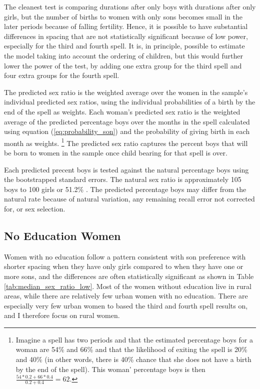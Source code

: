\documentclass[12pt,letterpaper]{article}
\begin{document}
The cleanest test is comparing durations after only boys with durations after
only girls, but the number of births to women with only sons becomes small 
in the later periods because of falling fertility.
Hence, it is possible to have substantial differences in spacing that are
not statistically significant because of low power, especially for the third 
and fourth spell.
It is, in principle, possible to estimate the model taking into account the 
ordering of children, but this would further lower the power of the test, by 
adding one extra group for the third spell and four extra groups for the fourth spell.

The predicted sex ratio is the weighted average over the women in the sample's 
individual predicted sex ratios, using the individual probabilities of a birth by 
the end of the spell as weights.
Each woman's predicted sex ratio is the weighted average of the predicted
percentage boys over the months in the spell calculated using equation 
(\ref{eq:probability_son}) and the probability of giving birth in each month 
as weights.%
\footnote{
Imagine a spell has two periods and that the estimated percentage boys for a
woman are 54\% and 66\% and that the likelihood of exiting the spell is 20\% and 40\%
(in other words, there is 40\% chance that she does not have a birth by the end of 
the spell).
This woman' percentage boys is then $\frac{54*0.2+66*0.4}{0.2+0.4} = 62$.
}
The predicted sex ratio captures the percent boys that will be born to women 
in the sample once child bearing for that spell is over.

Each predicted precent boys is tested against the natural percentage 
boys using the bootstrapped standard errors.
The natural sex ratio is approximately 105 boys to 100 girls or
51.2\% \citep{ben-porath76b,jacobsen99,Portner2015b}.
The predicted percentage boys may differ from the natural rate because of 
natural variation, any remaining recall error not corrected for, or 
sex selection. 

\subsection{No Education Women}



Women with no education follow a pattern consistent with son
preference with shorter spacing when they have only girls compared 
to when they have one or more sons, and the differences are often 
statistically significant as shown in Table \ref{tab:median_sex_ratio_low}.
Most of the women without education live in rural areas,
while there are relatively few urban women with no education.
There are especially very few urban women to based the third
and fourth spell results on, and I therefore focus on rural women.
\end{document}
